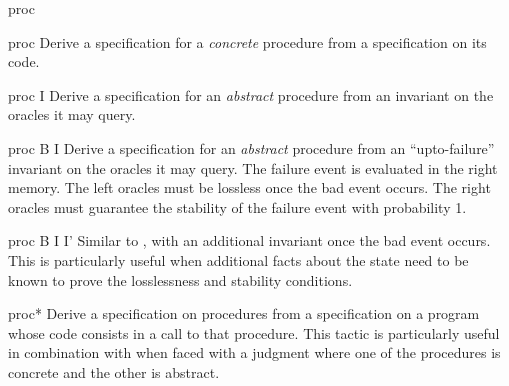 \begin{tactic}{proc}
  \begin{tsyntax}{proc}
  Derive a specification for a \emph{concrete} procedure from a
  specification on its code.
  \end{tsyntax}

  \begin{tsyntax}{proc I}
  Derive a specification for an \emph{abstract} procedure from an
  invariant on the oracles it may query.
  \end{tsyntax}

  \begin{tsyntax}{proc B I}
  Derive a specification for an \emph{abstract} procedure from an
  ``upto-failure'' invariant on the oracles it may query. The failure
  event  is evaluated in the right memory. The left oracles
  must be lossless once the bad event occurs. The right oracles must
  guarantee the stability of the failure event with probability 1.
  \end{tsyntax}

  \begin{tsyntax}{proc B I I'}
  Similar to , with an additional invariant once the bad
  event occurs. This is particularly useful when additional facts
  about the state need to be known to prove the losslessness and
  stability conditions.
  \end{tsyntax}

  \begin{tsyntax}{proc*}
  Derive a specification on procedures from a specification on a
  program whose code consists in a call to that procedure. This tactic
  is particularly useful in combination with  when
  faced with a \prhl judgment where one of the procedures is concrete
  and the other is abstract.
  \end{tsyntax}
\end{tactic}
